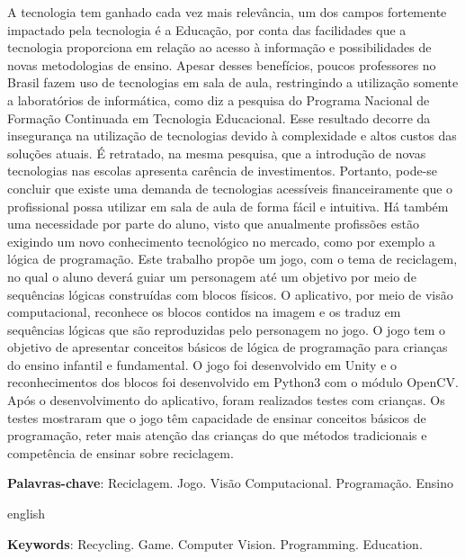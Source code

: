     \setlength{\absparsep}{18pt} 
    \begin{resumo}
    A tecnologia tem ganhado cada vez mais relevância, um dos campos fortemente impactado pela tecnologia é a Educação, por conta das facilidades que a tecnologia proporciona em relação ao acesso à informação e possibilidades de novas metodologias de ensino.
    Apesar desses benefícios, poucos professores no Brasil fazem uso de tecnologias em sala de aula, restringindo a utilização somente a laboratórios de informática, como diz a pesquisa do Programa Nacional de Formação Continuada em Tecnologia Educacional. Esse resultado decorre da insegurança na utilização de tecnologias devido à complexidade e altos custos das soluções atuais. É retratado, na mesma pesquisa, que a introdução de novas tecnologias nas escolas apresenta carência de investimentos.
    Portanto, pode-se concluir que existe uma demanda de tecnologias acessíveis financeiramente que o profissional possa utilizar em sala de aula de forma fácil e intuitiva.
    Há também uma necessidade por parte do aluno, visto que anualmente profissões estão exigindo um novo conhecimento tecnológico no mercado, como por exemplo a lógica de programação.
    Este trabalho propõe um jogo, com o tema de reciclagem, no qual o aluno deverá guiar um personagem até um objetivo por meio de sequências lógicas construídas com blocos físicos. O aplicativo, por meio de visão computacional, reconhece os blocos contidos na imagem e os traduz em sequências lógicas que são reproduzidas pelo personagem no jogo. O jogo tem o objetivo de apresentar conceitos básicos de lógica de programação para crianças do ensino infantil e fundamental. O jogo foi desenvolvido em Unity e o reconhecimentos dos blocos foi desenvolvido em Python3 com o módulo OpenCV.
    Após o desenvolvimento do aplicativo, foram realizados testes com crianças. Os testes mostraram que o jogo têm capacidade de ensinar conceitos básicos de programação, reter mais atenção das crianças do que métodos tradicionais e competência de ensinar sobre reciclagem.  
    
    \textbf{Palavras-chave}: Reciclagem. Jogo. Visão Computacional. Programação. Ensino
    \end{resumo}

    \begin{resumo}[Abstract]
     \begin{otherlanguage*}{english}
      
       
      \textbf{Keywords}: Recycling. Game. Computer Vision. Programming. Education.
     \end{otherlanguage*}
    \end{resumo}
